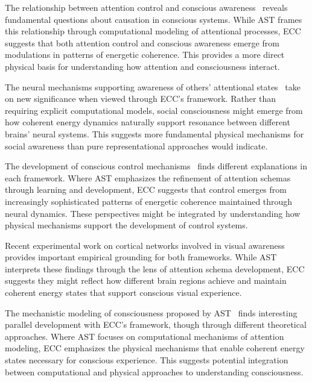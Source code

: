 The relationship between attention control and conscious awareness~\cite{WebbKemper2020, Dehaene2011} reveals fundamental questions about causation in conscious systems. While AST frames this relationship through computational modeling of attentional processes, ECC suggests that both attention control and conscious awareness emerge from modulations in patterns of energetic coherence. This provides a more direct physical basis for understanding how attention and consciousness interact.

The neural mechanisms supporting awareness of others' attentional states~\cite{Kelly2014, Graziano2011} take on new significance when viewed through ECC's framework. Rather than requiring explicit computational models, social consciousness might emerge from how coherent energy dynamics naturally support resonance between different brains' neural systems. This suggests more fundamental physical mechanisms for social awareness than pure representational approaches would indicate.

The development of conscious control mechanisms~\cite{Graziano2011, Mashour2020} finds different explanations in each framework. Where AST emphasizes the refinement of attention schemas through learning and development, ECC suggests that control emerges from increasingly sophisticated patterns of energetic coherence maintained through neural dynamics. These perspectives might be integrated by understanding how physical mechanisms support the development of control systems.

Recent experimental work on cortical networks involved in visual awareness~\cite{Webb2016, Koivisto2010} provides important empirical grounding for both frameworks. While AST interprets these findings through the lens of attention schema development, ECC suggests they might reflect how different brain regions achieve and maintain coherent energy states that support conscious visual experience.

The mechanistic modeling of consciousness proposed by AST~\cite{Kelly2016, Graziano2017} finds interesting parallel development with ECC's framework, though through different theoretical approaches. Where AST focuses on computational mechanisms of attention modeling, ECC emphasizes the physical mechanisms that enable coherent energy states necessary for conscious experience. This suggests potential integration between computational and physical approaches to understanding consciousness.

